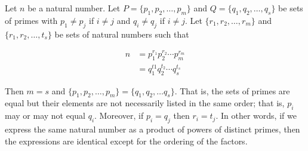 \documentclass[../main.tex]{subfiles}
\begin{document}
\begin{thm} \label{2.9}
  Let $n$ be a natural number. Let $P = \{p_1, p_2, \ldots, p_m\}$ and $Q = \{q_1, q_2,\ldots, q_s\}$ be sets of primes with $p_1 \neq p_j$ if $i \neq j$ and $q_i \neq q_j$ if $i \neq j$. Let $\{r_1, r_2, \ldots, r_m\}$ and $\{r_1, r_2,\ldots,t_s\}$ be sets of natural numbers such that

  \begin{align*}
    n &= p_1^{r_1} p_2^{r_2} \cdots p_m^{r_m} \\
      &= q_1^{t1} q_2^{t_2} \cdots q_s^{t_s}
  \end{align*}

  Then $m = s$ and $\{p_1, p_2, \ldots, p_m\} = \{q_1, q_2, \ldots q_s \}$. That is, the sets of primes are equal but their elements are not necessarily listed in the same order; that is, $p_i$ may or may not equal $q_i$. Moreover, if $p_i = q_j$ then $r_i = t_j$. In other words, if we express the same natural number as a product of powers of distinct primes, then the expressions are identical except for the ordering of the factors.
\end{thm}
\end{document}
